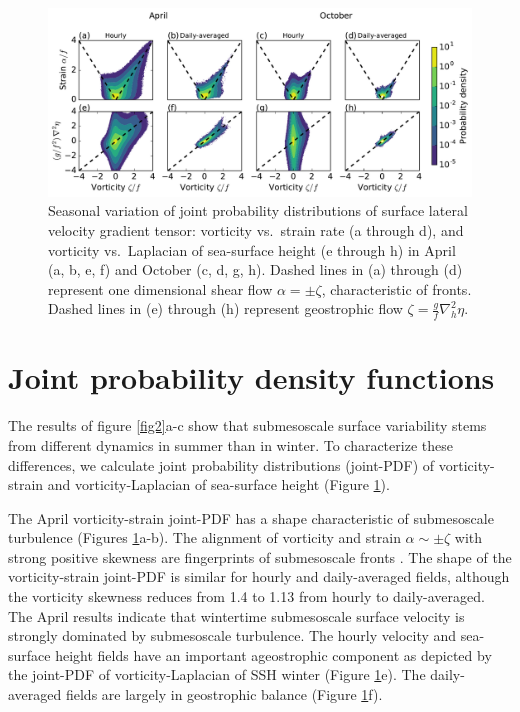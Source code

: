\documentclass[grl]{agutex2015}
\begin{document}
\begin{article}
\begin{figure}[ht]
  \begin{center}
    \includegraphics[width=.75\textwidth]{figs/fig3.pdf}
 \caption{\small Seasonal variation of joint probability distributions of
          surface lateral velocity gradient tensor:  vorticity vs.\
          strain rate (a through d),
          and vorticity vs.\ Laplacian of sea-surface height (e through h) in April (a, b,
          e, f) and October (c, d, g, h).
          Dashed lines in (a) through (d) represent one dimensional shear flow $\alpha = \pm\zeta$,
          characteristic of fronts. Dashed lines in (e) through
          (h) represent geostrophic flow $\zeta = \frac{g}{f}\nabla_h^2 \eta$.}
 \label{fig3}
 \end{center}
\end{figure}

\section{Joint probability density functions}

The results of figure \ref{fig2}a-c show that submesoscale surface
 variability stems from different dynamics in summer than in winter.
 To characterize these differences, we calculate
joint probability distributions (joint-PDF) of
vorticity-strain and vorticity-Laplacian of sea-surface height (Figure \ref{fig3}).

The April vorticity-strain joint-PDF has a shape characteristic of submesoscale turbulence
 (Figures \ref{fig3}a-b). The alignment of vorticity and strain $\alpha \sim \pm\zeta$
 with strong positive skewness are fingerprints of submesoscale fronts
 \citep{shcherbina_etal2013,mcwilliams2016}. The shape of the vorticity-strain
 joint-PDF is similar for hourly and daily-averaged fields, although
 the vorticity skewness reduces from 1.4 to 1.13 from hourly to daily-averaged.
 The April results indicate that wintertime submesoscale
 surface velocity is strongly dominated by submesoscale turbulence.
 The hourly velocity and sea-surface height fields have an important
ageostrophic component as depicted by the joint-PDF of vorticity-Laplacian of SSH
winter (Figure \ref{fig3}e). The daily-averaged fields
are largely
in  geostrophic balance (Figure \ref{fig3}f).


\end{article}
\end{document}
